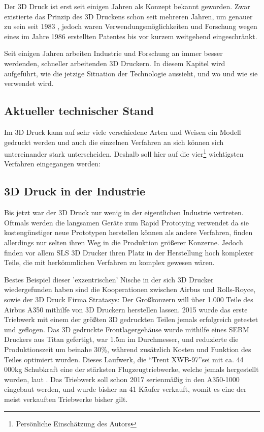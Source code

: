 
Der 3D Druck ist erst seit einigen Jahren als Konzept bekannt geworden.
Zwar existierte das Prinzip des 3D Druckens schon seit mehreren Jahren, um genauer zu sein seit 1983 \parencite{CHUCK}, jedoch waren Verwendungsmöglichkeiten und Forschung wegen eines im Jahre 1986 erstellten Patentes bis vor kurzem weitgehend eingeschränkt.

Seit einigen Jahren arbeiten Industrie und Forschung an immer besser werdenden, schneller arbeitenden 3D Druckern. In diesem Kapitel wird aufgeführt, wie die jetzige Situation der Technologie aussieht, und wo und wie sie verwendet wird.

\subsection{Aktueller technischer Stand}

Im 3D Druck kann auf sehr viele verschiedene Arten und Weisen ein Modell gedruckt werden und auch die einzelnen Verfahren an sich können sich untereinander stark unterscheiden.
Deshalb soll hier auf die vier\footnote{Persönliche Einschätzung des Autors} wichtigsten Verfahren eingegangen werden:






\subsection{3D Druck in der Industrie}

Bis jetzt war der 3D Druck nur wenig in der eigentlichen Industrie vertreten. Oftmals werden die langsamen Geräte zum Rapid Prototying verwendet da sie kostengünstiger neue Prototypen herstellen können als andere Verfahren, finden allerdings nur selten ihren Weg in die Produktion größerer Konzerne. Jedoch finden vor allem SLS 3D Drucker ihren Platz in der Herstellung hoch komplexer Teile, die mit herkömmlichen Verfahren zu komplex gewesen wären. 

Bestes Beispiel dieser 'exzentrischen' Nische in der sich 3D Drucker wiedergefunden haben sind die Kooperationen zwischen Airbus und Rolls-Royce, sowie der 3D Druck Firma Stratasys: Der Großkonzern will über 1.000 Teile des Airbus A350 mithilfe von 3D Druckern herstellen lassen. 2015 wurde das erste Triebwerk mit einem der größten 3D gedruckten Teilen jemals erfolgreich getestet und geflogen. Das 3D gedruckte Frontlagergehäuse wurde mithilfe eines SEBM Druckers aus Titan gefertigt, war 1.5m im Durchmesser, und reduzierte die Produktionszeit um beinahe 30\%, während zusätzlich Kosten und Funktion des Teiles optimiert wurden. Dieses Laufwerk, die \textquotedblleft Trent XWB-97\textquotedblright sei mit ca. 44 000kg Schubkraft eine der stärksten Flugzeugtriebwerke, welche jemals hergestellt wurden, laut \textcite{TRENT}. Das Triebwerk soll schon 2017 serienmäßig in den A350-1000 eingebaut werden, und wurde bisher an 41 Käufer verkauft, womit es eine der meist verkauften Triebwerke bisher gilt.

